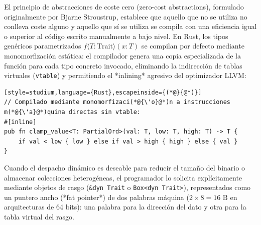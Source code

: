 \documentclass{book}
\begin{document}
El principio de abstracciones de coste cero (zero-cost abstractions), formulado originalmente por Bjarne Stroustrup, establece que aquello que no se utiliza no conlleva coste alguno y aquello que sí se utiliza se compila con una eficiencia igual o superior al código escrito manualmente a bajo nivel. En Rust, los tipos genéricos parametrizados \(f\langle T: \text{Trait}\rangle(x: T)\) se compilan por defecto mediante monomorfización estática: el compilador genera una copia especializada de la función para cada tipo concreto invocado, eliminando la indirección de tablas virtuales (\texttt{vtable}) y permitiendo el *inlining* agresivo del optimizador LLVM:
\begin{lstlisting}[style=studium,language={Rust},escapeinside={(*@}{@*)}]
// Compilado mediante monomorfizaci(*@{\'o}@*)n a instrucciones m(*@{\'a}@*)quina directas sin vtable:
#[inline]
pub fn clamp_value<T: PartialOrd>(val: T, low: T, high: T) -> T {
    if val < low { low } else if val > high { high } else { val }
}
\end{lstlisting}
Cuando el despacho dinámico es deseable para reducir el tamaño del binario o almacenar colecciones heterogéneas, el programador lo solicita explícitamente mediante objetos de rasgo (\texttt{\&dyn Trait} o \texttt{Box<dyn Trait>}), representados como un puntero ancho (*fat pointer*) de dos palabras máquina (\(2 \times 8 = 16\text{ B}\) en arquitecturas de 64 bits): una palabra para la dirección del dato y otra para la tabla virtual del rasgo.
\end{document}
